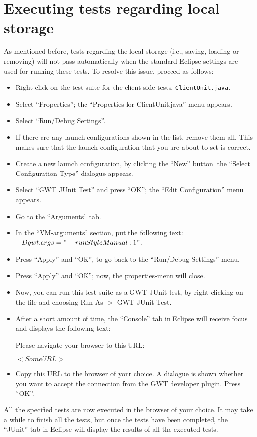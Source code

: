 \section{Executing tests regarding local storage}\label{sec:localStorageProc}
As mentioned before, tests regarding the local storage (i.e., saving, loading or removing) will not pass automatically when the standard Eclipse settings are used for running these tests. To resolve this issue, proceed as follows:
\begin{itemize}
	\item Right-click on the test suite for the client-side tests, \texttt{ClientUnit.java}.
	\item Select ``Properties''; the ``Properties for ClientUnit.java'' menu appears.
	\item Select ``Run/Debug Settings''. 
	\item If there are any launch configurations shown in the list, remove them all. This makes sure that the launch configuration that you are about to set is correct.
	\item Create a new launch configuration, by clicking the ``New'' button; the ``Select Configuration Type'' dialogue appears.
	\item Select ``GWT JUnit Test'' and press ``OK''; the ``Edit Configuration'' menu appears.
	\item Go to the ``Arguments'' tab.
	\item In the ``VM-arguments'' section, put the following text: $-Dgwt.args="-runStyle Manual:1"$.
	\item Press ``Apply'' and ``OK'', to go back to the ``Run/Debug Settings'' menu.
	\item Press ``Apply'' and ``OK''; now, the properties-menu will close.
	\item Now, you can run this test suite as a GWT JUnit test, by right-clicking on the file and choosing Run As $>$ GWT JUnit Test.
	\item After a short amount of time, the ``Console'' tab in Eclipse will receive focus and displays the following text:

	\noindent Please navigate your browser to this URL:

	\noindent $<Some URL>$
	\item Copy this URL to the browser of your choice. A dialogue is shown whether you want to accept the connection from the GWT developer plugin. Press ``OK''.
\end{itemize}

\fpstartparagraph{} All the specified tests are now executed in the browser of your choice. It may take a while to finish all the tests, but once the tests have been completed, the ``JUnit'' tab in Eclipse will display the results of all the executed tests.

